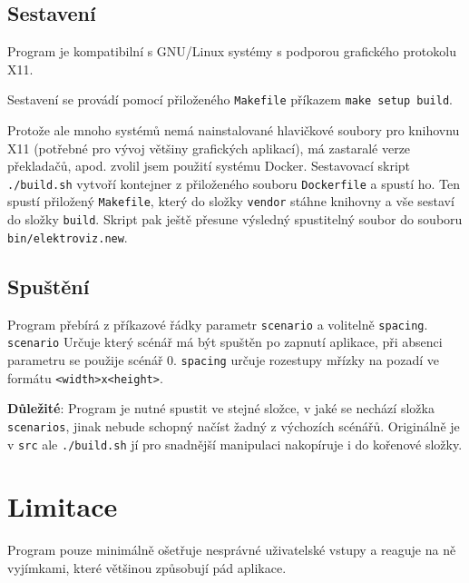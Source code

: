 \documentclass[12pt,a4paper]{paper}
\newcommand{\code}[1]{\texttt{#1}}
\begin{document}
\subsection{Sestavení}

Program je kompatibilní s GNU/Linux systémy s podporou grafického protokolu X11.

Sestavení se provádí pomocí přiloženého \code{Makefile} příkazem \code{make
setup build}.

Protože ale mnoho systémů nemá nainstalované hlavičkové soubory pro knihovnu X11
(potřebné pro vývoj většiny grafických aplikací), má zastaralé verze překladačů,
apod. zvolil jsem použití systému Docker. Sestavovací skript \code{./build.sh}
vytvoří kontejner z přiloženého souboru \code{Dockerfile} a spustí ho. Ten 
spustí přiložený \code{Makefile}, který do složky \code{vendor} stáhne knihovny
a vše sestaví do složky \code{build}. Skript pak ještě přesune výsledný
spustitelný soubor do souboru \code{bin/elektroviz.new}.

\subsection{Spuštění}

Program přebírá z příkazové řádky parametr \code{scenario} a volitelně
\code{spacing}. \code{scenario} Určuje který scénář má být spuštěn po zapnutí
aplikace, při absenci parametru se použije scénář 0. \code{spacing} určuje
rozestupy mřízky na pozadí ve formátu \code{<width>x<height>}.

\textbf{Důležité}: Program je nutné spustit ve stejné složce, v jaké se nechází
složka \code{scenarios}, jinak nebude schopný načíst žadný z výchozích scénářů.
Originálně je v \code{src} ale \code{./build.sh} jí pro snadnější manipulaci
nakopíruje i do kořenové složky.

\section{Limitace}

Program pouze minimálně ošetřuje nesprávné uživatelské vstupy a reaguje na ně
vyjímkami, které většinou způsobují pád aplikace. 
\end{document}
